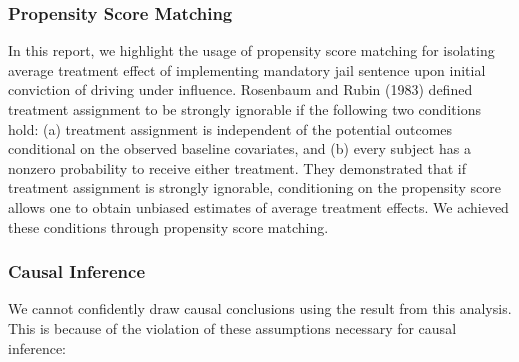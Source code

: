 \documentclass[]{article}
\begin{document}
\hypertarget{propensity-score-matching}{%
\subsubsection{Propensity Score
Matching}\label{propensity-score-matching}}

In this report, we highlight the usage of propensity score matching for
isolating average treatment effect of implementing mandatory jail
sentence upon initial conviction of driving under influence. Rosenbaum
and Rubin (1983) defined treatment assignment to be strongly ignorable
if the following two conditions hold: (a) treatment assignment is
independent of the potential outcomes conditional on the observed
baseline covariates, and (b) every subject has a nonzero probability to
receive either treatment. They demonstrated that if treatment assignment
is strongly ignorable, conditioning on the propensity score allows one
to obtain unbiased estimates of average treatment effects. We achieved
these conditions through propensity score matching.

\hypertarget{causal-inference}{%
\subsubsection{Causal Inference}\label{causal-inference}}

We cannot confidently draw causal conclusions using the result from this
analysis. This is because of the violation of these assumptions
necessary for causal inference:
\end{document}
